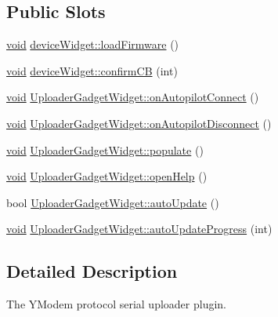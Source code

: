 \subsection*{\-Public \-Slots}
\begin{DoxyCompactItemize}
\item 
\hyperlink{group___u_a_v_objects_plugin_ga444cf2ff3f0ecbe028adce838d373f5c}{void} \hyperlink{group___y_modem_uploader_gafbf692fdd482b85feb6510193a242a87}{device\-Widget\-::load\-Firmware} ()
\item 
\hyperlink{group___u_a_v_objects_plugin_ga444cf2ff3f0ecbe028adce838d373f5c}{void} \hyperlink{group___y_modem_uploader_ga116ecb3aed92f7f793ea4769a7e0572d}{device\-Widget\-::confirm\-C\-B} (int)
\item 
\hyperlink{group___u_a_v_objects_plugin_ga444cf2ff3f0ecbe028adce838d373f5c}{void} \hyperlink{group___y_modem_uploader_gaea63c2ee4a2337a9c75b7e6908a07f68}{\-Uploader\-Gadget\-Widget\-::on\-Autopilot\-Connect} ()
\item 
\hyperlink{group___u_a_v_objects_plugin_ga444cf2ff3f0ecbe028adce838d373f5c}{void} \hyperlink{group___y_modem_uploader_ga1b05eaf13f62105422817f202a60d4c5}{\-Uploader\-Gadget\-Widget\-::on\-Autopilot\-Disconnect} ()
\item 
\hyperlink{group___u_a_v_objects_plugin_ga444cf2ff3f0ecbe028adce838d373f5c}{void} \hyperlink{group___y_modem_uploader_ga5c67435d0108ea6ee60ef37fd1ad3298}{\-Uploader\-Gadget\-Widget\-::populate} ()
\item 
\hyperlink{group___u_a_v_objects_plugin_ga444cf2ff3f0ecbe028adce838d373f5c}{void} \hyperlink{group___y_modem_uploader_ga49b9f0a5fc35f08fc0ee463dedcfe341}{\-Uploader\-Gadget\-Widget\-::open\-Help} ()
\item 
bool \hyperlink{group___y_modem_uploader_gae4f6b196112377e3983e45e785c14242}{\-Uploader\-Gadget\-Widget\-::auto\-Update} ()
\item 
\hyperlink{group___u_a_v_objects_plugin_ga444cf2ff3f0ecbe028adce838d373f5c}{void} \hyperlink{group___y_modem_uploader_gaa59bd4196108e1a79e22ee1d10cf4a92}{\-Uploader\-Gadget\-Widget\-::auto\-Update\-Progress} (int)
\end{DoxyCompactItemize}


\subsection{\-Detailed \-Description}
\-The \-Y\-Modem protocol serial uploader plugin. 

